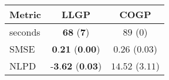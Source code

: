 \begin{tabular}{lcc}\toprule
Metric & LLGP & COGP\\
\midrule
seconds & $\textbf{68}$ ($\textbf{7}$) & $89$ ($0$)\\
SMSE & $\textbf{0.21}$ ($\textbf{0.00}$) & $0.26$ ($0.03$)\\
NLPD & $\textbf{-3.62}$ ($\textbf{0.03}$) & $14.52$ ($3.11$)\\

\bottomrule
\end{tabular}
